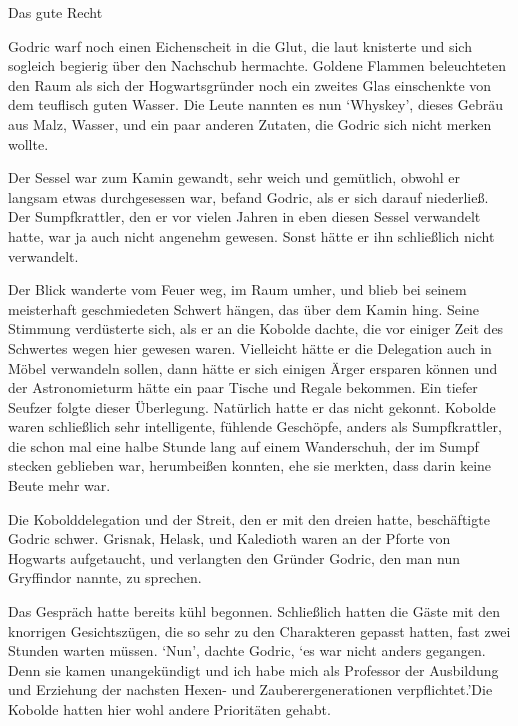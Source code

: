 \documentclass[fontsize=12pt]{scrartcl}
\begin{document}
	{\huge Das gute Recht}
	\vspace{15pt}
	
	{\LARGE G}odric warf noch einen Eichenscheit in die Glut, die laut knisterte und sich sogleich begierig über den Nachschub hermachte. Goldene Flammen beleuchteten den Raum als sich der Hogwartsgründer noch ein zweites Glas einschenkte von dem teuflisch guten Wasser. Die Leute nannten es nun \lq Whyskey\rq, dieses Gebräu aus Malz, Wasser, und ein paar anderen Zutaten, die Godric sich nicht merken wollte.
	
	Der Sessel war zum Kamin gewandt, sehr weich und gemütlich, obwohl er langsam etwas durchgesessen war, befand Godric, als er sich darauf niederließ. Der Sumpfkrattler, den er vor vielen Jahren in eben diesen Sessel verwandelt hatte, war ja auch nicht angenehm gewesen. Sonst hätte er ihn schließlich nicht verwandelt.
	
	Der Blick wanderte vom Feuer weg, im Raum umher, und blieb bei seinem meisterhaft geschmiedeten Schwert hängen, das über dem Kamin hing. Seine Stimmung verdüsterte sich, als er an die Kobolde dachte, die vor einiger Zeit des Schwertes wegen hier gewesen waren. Vielleicht hätte er die Delegation auch in Möbel verwandeln sollen, dann hätte er sich einigen Ärger ersparen können und der Astronomieturm hätte ein paar Tische und Regale bekommen.  Ein tiefer Seufzer folgte dieser Überlegung. Natürlich hatte er das nicht gekonnt. Kobolde waren schließlich sehr intelligente, fühlende Geschöpfe, anders als Sumpfkrattler, die schon mal eine halbe Stunde lang auf einem Wanderschuh, der im Sumpf stecken geblieben war, herumbeißen konnten, ehe sie merkten, dass darin keine Beute mehr war. 
	
	Die Kobolddelegation und der Streit, den er mit den dreien hatte, beschäftigte Godric schwer. Grisnak, Helask, und Kaledioth waren an der Pforte von Hogwarts aufgetaucht, und verlangten den Gründer Godric, den man  nun Gryffindor nannte, zu sprechen. 
	
	Das Gespräch hatte bereits kühl begonnen. Schließlich hatten die Gäste mit den knorrigen Gesichtszügen, die so sehr zu den Charakteren gepasst hatten, fast zwei Stunden warten müssen. \lq Nun\rq, dachte Godric, \lq es war nicht anders gegangen. Denn sie kamen unangekündigt und ich habe mich als Professor der Ausbildung und Erziehung der nachsten Hexen- und Zauberergenerationen verpflichtet.\rq Die Kobolde hatten hier wohl andere Prioritäten gehabt.
	
\end{document}
